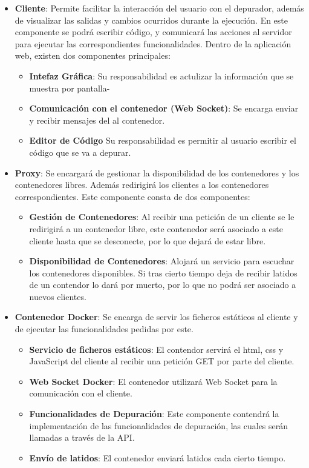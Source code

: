 \begin{itemize}
    \item \textbf{Cliente}: Permite facilitar la interacción del usuario con el depurador, además de visualizar las salidas y cambios ocurridos durante la ejecución. En este componente se podrá escribir código, y comunicará las acciones al servidor para ejecutar las correspondientes funcionalidades. 
    Dentro de la aplicación web, existen dos componentes principales:

    \begin{itemize}
        \item \textbf{Intefaz Gráfica}: Su responsabilidad es actulizar la información que se muestra por pantalla-
        \item \textbf{Comunicación con el contenedor (Web Socket)}: Se encarga enviar y recibir mensajes del al contenedor.
        \item \textbf{Editor de Código} Su responsabilidad es permitir al usuario escribir el código que se va a depurar.
    \end{itemize}

    \item \textbf{Proxy}: Se encargará de gestionar la disponibilidad de los contenedores y los contenedores libres. Además redirigirá los clientes a los contenedores correspondientes.
    Este componente consta de dos componentes:
    \begin{itemize}
        \item \textbf{Gestión de Contenedores}: Al recibir una petición de un cliente se le redirigirá a un contenedor libre, este contenedor será asociado a este cliente hasta que se desconecte, por lo que dejará de estar libre.
        \item \textbf{Disponibilidad de Contenedores}: Alojará un servicio para escuchar los contenedores disponibles. Si tras cierto tiempo deja de recibir latidos de un contendor lo dará por muerto, por lo que no podrá ser asociado a nuevos clientes.  
    \end{itemize}

    \item \textbf{Contenedor Docker}: Se encarga de servir los ficheros estáticos al cliente y de ejecutar las funcionalidades pedidas por este.
    \begin{itemize}
        \item \textbf{Servicio de ficheros estáticos}: El contendor servirá el html, css y JavaScript del cliente al recibir una petición GET por parte del cliente.
        \item \textbf{Web Socket Docker}: El contenedor utilizará Web Socket para la comunicación con el cliente.
        \item \textbf{Funcionalidades de Depuración}: Este componente contendrá la implementación de las funcionalidades de depuración, las cuales serán llamadas a través de la API.
        \item \textbf{Envío de latidos}: El contenedor enviará latidos cada cierto tiempo.
    \end{itemize}
\end{itemize}

